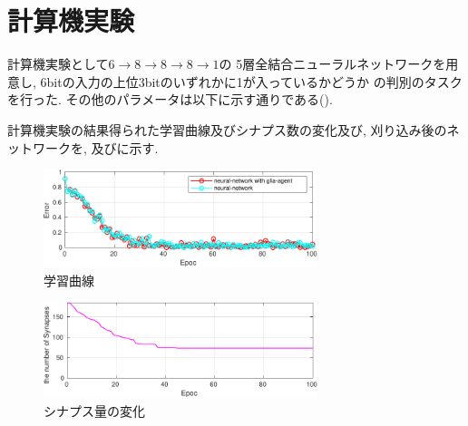 \documentclass[a4paper, 9pt,twocolumn,dvipdfmx]{jsarticle}
\begin{document}
\section{計算機実験}
計算機実験として$6\rightarrow 8\rightarrow 8\rightarrow 8\rightarrow 1$の
5層全結合ニューラルネットワークを用意し, 
6bitの入力の上位3bitのいずれかに1が入っているかどうか
の判別のタスクを行った.
その他のパラメータは以下に示す通りである().
\vspace{-0.5cm}
\begin{table}[H]
  \caption{パラメータ一覧}
  \label{tab:param}
  \centering
 \end{table}
計算機実験の結果得られた学習曲線及びシナプス数の変化及び, 刈り込み後のネットワークを, 
及びに示す.
\begin{figure}[H]
  \centering
  \includegraphics[width=8cm]{LearningCurve-crop.pdf} 
  \caption{学習曲線}
  \label{fig:LearningCurve}
\end{figure}
\vspace{-2zh}
\begin{figure}[H]
  \centering
  \includegraphics[width=8cm]{SynapseNum-crop.pdf} 
  \caption{シナプス量の変化}
  \label{fig:SynapseNum}
\end{figure}
\end{document}
